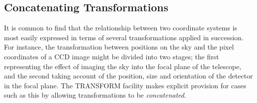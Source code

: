 \documentclass[twoside,nolof,11pt]{starlink}
\providecommand{\name}[1]{\small{#1}}
\begin{document}
\subsection{Concatenating Transformations}

\label{section:additional:concatenate}

It is common to find that the relationship between two coordinate systems is
most easily expressed in terms of several transformations applied in
succession.
For instance, the transformation between positions on the sky and the pixel
coordinates of a \name{CCD} image might be divided into two stages; the
first representing the effect of imaging the sky into the focal plane of the
telescope, and the second taking account of the position, size and
orientation of the detector in the focal plane.
The \name{TRANSFORM} facility makes explicit provision for cases such as
this by allowing transformations to be \emph{concatenated}.
\end{document}
